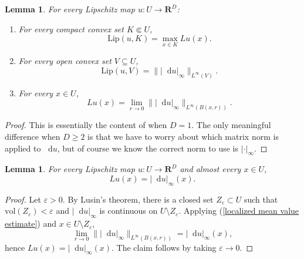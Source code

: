 \documentclass[reqno,11pt]{amsart}
\newcommand{\RR}{\mathbf{R}}
\newcommand*\dif{\mathop{}\!\mathrm{d}}
\newcommand{\vol}{\mathrm{vol}}
\newcommand{\Lip}{\mathrm{Lip}}
\newtheorem{lemma}[theorem]{Lemma}
\theoremstyle{definition}
\numberwithin{equation}{section}
\begin{document}
\begin{lemma}
For every Lipschitz map $u: U \to \RR^D$:
\begin{enumerate}
\item For every compact convex set $K \Subset U$,
\begin{equation}\label{Lip is sup of local Lips}
\Lip(u, K) = \max_{x \in K} Lu(x).
\end{equation}
\item For every open convex set $V \subseteq U$,
\begin{equation}\label{mean value estimate}
\Lip(u, V) = \||\dif u|_\infty\|_{L^\infty(V)}.
\end{equation}
\item For every $x \in U$,
\begin{equation}\label{localized mean value estimate}
Lu(x) = \lim_{r \to 0} \||\dif u|_\infty\|_{L^\infty(B(x, r))}.
\end{equation}
\end{enumerate}
\end{lemma}
\begin{proof}
This is essentially the content of \cite[Lemma 4.2]{Crandall2008} when $D = 1$.
The only meaningful difference when $D \geq 2$ is that we have to worry about which matrix norm is applied to $\dif u$, but of course we know the correct norm to use is $|\cdot|_\infty$.
\end{proof}

\begin{lemma}\label{Lip is du}
For every Lipschitz map $u: U \to \RR^D$ and almost every $x \in U$,
$$Lu(x) = |\dif u|_\infty(x).$$
\end{lemma}
\begin{proof}
Let $\varepsilon > 0$.
By Lusin's theorem, there is a closed set $Z_\varepsilon \subset U$ such that $\vol(Z_\varepsilon) < \varepsilon$ and $|\dif u|_\infty$ is continuous on $U \setminus Z_\varepsilon$.
Applying (\ref{localized mean value estimate}) and $x \in U \setminus Z_\varepsilon$,
$$\lim_{r \to 0} \||\dif u|_\infty\|_{L^\infty(B(x, r))} = |\dif u|_\infty(x),$$
hence $Lu(x) = |\dif u|_\infty(x)$.
The claim follows by taking $\varepsilon \to 0$.
\end{proof}
\end{document}
